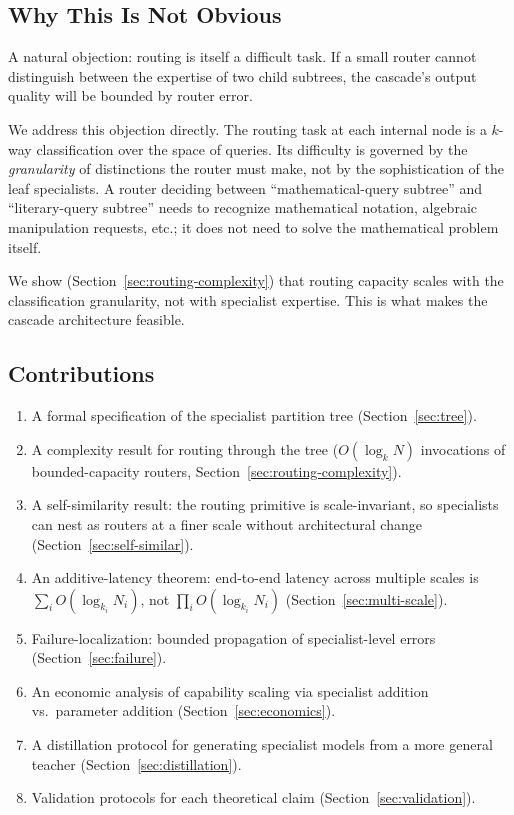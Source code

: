 \documentclass[11pt,a4paper]{article}
\theoremstyle{definition}
\theoremstyle{remark}
\begin{document}
\subsection{Why This Is Not Obvious}

A natural objection: routing is itself a difficult task. If a small router cannot distinguish between the expertise of two child subtrees, the cascade's output quality will be bounded by router error.

We address this objection directly. The routing task at each internal node is a $k$-way classification over the space of queries. Its difficulty is governed by the \emph{granularity} of distinctions the router must make, not by the sophistication of the leaf specialists. A router deciding between ``mathematical-query subtree'' and ``literary-query subtree'' needs to recognize mathematical notation, algebraic manipulation requests, etc.; it does not need to solve the mathematical problem itself.

We show (Section~\ref{sec:routing-complexity}) that routing capacity scales with the classification granularity, not with specialist expertise. This is what makes the cascade architecture feasible.

\subsection{Contributions}

\begin{enumerate}
    \item A formal specification of the specialist partition tree (Section~\ref{sec:tree}).
    \item A complexity result for routing through the tree ($O(\log_k N)$ invocations of bounded-capacity routers, Section~\ref{sec:routing-complexity}).
    \item A self-similarity result: the routing primitive is scale-invariant, so specialists can nest as routers at a finer scale without architectural change (Section~\ref{sec:self-similar}).
    \item An additive-latency theorem: end-to-end latency across multiple scales is $\sum_i O(\log_{k_i} N_i)$, not $\prod_i O(\log_{k_i} N_i)$ (Section~\ref{sec:multi-scale}).
    \item Failure-localization: bounded propagation of specialist-level errors (Section~\ref{sec:failure}).
    \item An economic analysis of capability scaling via specialist addition vs.\ parameter addition (Section~\ref{sec:economics}).
    \item A distillation protocol for generating specialist models from a more general teacher (Section~\ref{sec:distillation}).
    \item Validation protocols for each theoretical claim (Section~\ref{sec:validation}).
\end{enumerate}
\end{document}
